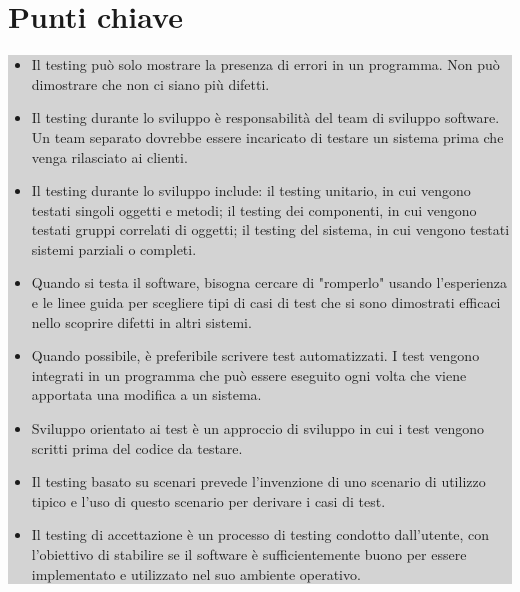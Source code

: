 \section{Punti chiave}
\begin{center}
\begin{minipage}{\textwidth}
\colorbox{lightgray}{
\parbox{\linewidth}{
\begin{itemize} 
    \item Il testing può solo mostrare la presenza di errori in un programma. Non può dimostrare che non ci siano più difetti.
    \item Il testing durante lo sviluppo è responsabilità del team di sviluppo software. Un team separato dovrebbe essere incaricato di testare un sistema prima che venga rilasciato ai clienti.
    \item Il testing durante lo sviluppo include: il testing unitario, in cui vengono testati singoli oggetti e metodi; il testing dei componenti, in cui vengono testati gruppi correlati di oggetti; il testing del sistema, in cui vengono testati sistemi parziali o completi.
    \item Quando si testa il software, bisogna cercare di "romperlo" usando l’esperienza e le linee guida per scegliere tipi di casi di test che si sono dimostrati efficaci nello scoprire difetti in altri sistemi.
    \item Quando possibile, è preferibile scrivere test automatizzati. I test vengono integrati in un programma che può essere eseguito ogni volta che viene apportata una modifica a un sistema.
    \item Sviluppo orientato ai test è un approccio di sviluppo in cui i test vengono scritti prima del codice da testare.
    \item Il testing basato su scenari prevede l’invenzione di uno scenario di utilizzo tipico e l’uso di questo scenario per derivare i casi di test.
    \item Il testing di accettazione è un processo di testing condotto dall'utente, con l’obiettivo di stabilire se il software è sufficientemente buono per essere implementato e utilizzato nel suo ambiente operativo.
\end{itemize}
}}
\end{minipage}
\end{center}